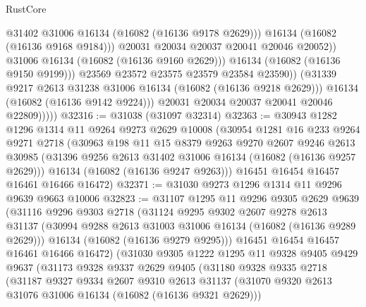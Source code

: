 \begin{lexlean}{RustCore}
\begin{coremodule}
                                @31402
                                @31006
                                @16134
                                (@16082 (@16136 @9178 @2629)))
                              @16134
                              (@16082 (@16136 @9168 @9184)))
                            @20031
                            @20034
                            @20037
                            @20041
                            @20046
                            @20052))
                        @31006
                        @16134
                        (@16082 (@16136 @9160 @2629)))
                      @16134
                      (@16082 (@16136 @9150 @9199)))
                    @23569
                    @23572
                    @23575
                    @23579
                    @23584
                    @23590))
                (@31339 @9217 @2613 @31238 @31006 @16134 (@16082 (@16136 @9218 @2629)))
                @16134
                (@16082 (@16136 @9142 @9224)))
              @20031
              @20034
              @20037
              @20041
              @20046
              @22809)))))
@32316 := @31038 (@31097 @32314)
@32363 := @30943
    @1282
    @1296
    @1314
    @11
    @9264
    @9273
    @2629
    @10008
    (@30954
      @1281
      @16
      @233
      @9264
      @9271
      @2718
      (@30963
        @198
        @11
        @15
        @8379
        @9263
        @9270
        @2607
        @9246
        @2613
        @30985
        (@31396 @9256 @2613 @31402 @31006 @16134 (@16082 (@16136 @9257 @2629)))
        @16134
        (@16082 (@16136 @9247 @9263)))
      @16451
      @16454
      @16457
      @16461
      @16466
      @16472)
@32371 := @31030 @9273 @1296 @1314 @11 @9296 @9639 @9663 @10006
@32823 := @31107
    @1295
    @11
    @9296
    @9305
    @2629
    @9639
    (@31116
      @9296
      @9303
      @2718
      (@31124
        @9295
        @9302
        @2607
        @9278
        @2613
        @31137
        (@30994 @9288 @2613 @31003 @31006 @16134 (@16082 (@16136 @9289 @2629)))
        @16134
        (@16082 (@16136 @9279 @9295)))
      @16451
      @16454
      @16457
      @16461
      @16466
      @16472)
    (@31030
      @9305
      @1222
      @1295
      @11
      @9328
      @9405
      @9429
      @9637
      (@31173
        @9328
        @9337
        @2629
        @9405
        (@31180
          @9328
          @9335
          @2718
          (@31187
            @9327
            @9334
            @2607
            @9310
            @2613
            @31137
            (@31070 @9320 @2613 @31076 @31006 @16134 (@16082 (@16136 @9321 @2629)))

\end{coremodule}
\end{lexlean}
